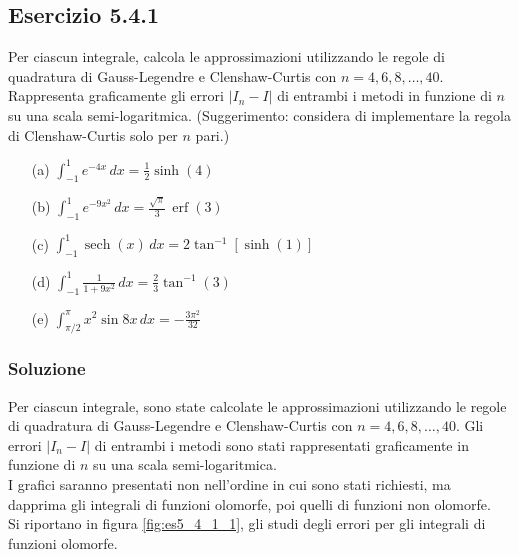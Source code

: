 \documentclass[letterpaper, 12pt]{article}
\begin{document}
\subsection{Esercizio 5.4.1}
Per ciascun integrale, calcola le approssimazioni utilizzando le regole di quadratura di Gauss-Legendre e 
Clenshaw-Curtis con $n=4,6,8,\ldots,40$. Rappresenta graficamente gli errori $|I_n-I|$ di entrambi i metodi 
in funzione di $n$ su una scala semi-logaritmica. (Suggerimento: considera di implementare la regola di 
Clenshaw-Curtis solo per $n$ pari.)

\begin{itemize}
    \item[(a)] $\displaystyle\int_{-1}^1 e^{-4x}\, dx = \frac{1}{2}\sinh(4)$
    \item[(b)] $\displaystyle\int_{-1}^1 e^{-9x^2}\, dx = \frac{\sqrt{\pi}}{3}\, \operatorname{erf}(3)$
    \item[(c)] $\displaystyle\int_{-1}^1 \operatorname{sech}(x) \, dx = 2 \tan^{-1} [ \sinh (1) ]$
    \item[(d)] $\displaystyle\int_{-1}^1 \frac{1}{1+9x^2}\, dx = \frac{2}{3} \tan^{-1}(3)$
    \item[(e)] $\displaystyle\int_{\pi/2}^{\pi} x^2 \sin 8x \, d x = -\frac{3 \pi^2}{32}$
\end{itemize}

\subsubsection{Soluzione}
Per ciascun integrale, sono state calcolate le approssimazioni utilizzando le regole di quadratura di 
Gauss-Legendre e Clenshaw-Curtis con $n=4,6,8,\ldots,40$. Gli errori $|I_n-I|$ di entrambi i metodi 
sono stati rappresentati graficamente in funzione di $n$ su una scala semi-logaritmica.\\
I grafici saranno presentati non nell'ordine in cui sono stati richiesti, ma dapprima gli integrali di
funzioni olomorfe, poi quelli di funzioni non olomorfe. \\
Si riportano in figura \ref{fig:es5_4_1_1}, gli studi degli errori per gli integrali di funzioni olomorfe.
\end{document}
